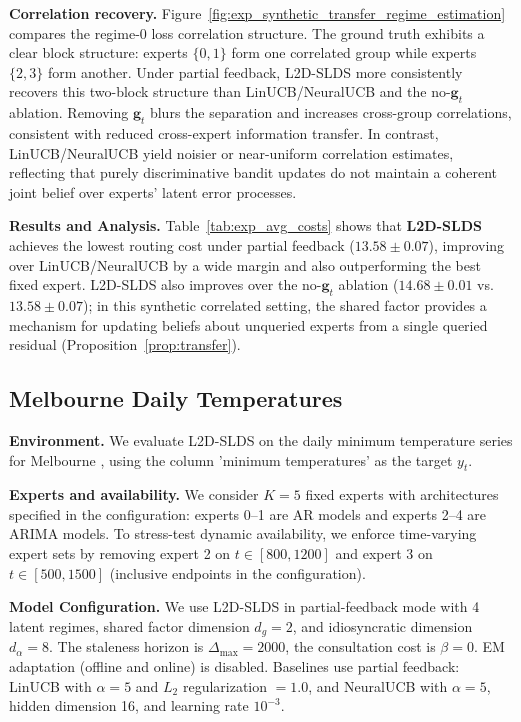 \textbf{Correlation recovery.}
Figure~\ref{fig:exp_synthetic_transfer_regime_estimation} compares the regime-0 loss correlation
structure. The ground truth exhibits a clear block structure: experts \(\{0,1\}\)
form one correlated group while experts \(\{2,3\}\) form another.
Under partial feedback, L2D-SLDS more consistently recovers this two-block structure than
LinUCB/NeuralUCB and the no-\(\mathbf{g}_t\) ablation. Removing \(\mathbf{g}_t\) blurs the separation
and increases cross-group correlations, consistent with reduced cross-expert information transfer.
In contrast, LinUCB/NeuralUCB yield noisier or near-uniform correlation estimates, reflecting that
purely discriminative bandit updates do not maintain a coherent joint belief over experts' latent
error processes.

\textbf{Results and Analysis.}
Table~\ref{tab:exp_avg_costs} shows that \textbf{L2D-SLDS} achieves the lowest routing cost under
partial feedback (\(13.58\pm 0.07\)), improving over LinUCB/NeuralUCB by a wide margin and also
outperforming the best fixed expert. L2D-SLDS also improves over the no-\(\mathbf{g}_t\) ablation
(\(14.68\pm 0.01\) vs.\ \(13.58\pm 0.07\)); in this synthetic correlated setting, the shared factor
provides a mechanism for updating beliefs about unqueried experts from a single queried residual
(Proposition~\ref{prop:transfer}).

\subsection{Melbourne Daily Temperatures}
\label{sec:exp_melbourne}

\textbf{Environment.}
We evaluate L2D-SLDS on the daily minimum temperature series for Melbourne \citep{daily_min_temp_melbourne_kaggle}, using the column 'minimum temperatures' as the target \(y_t\). 

\textbf{Experts and availability.}
We consider \(K=5\) fixed experts with architectures specified in the configuration:
experts 0--1 are AR models and experts 2--4 are ARIMA models. To stress-test dynamic availability, we enforce time-varying expert sets by removing expert 2 on
\(t\in[800,1200]\) and expert 3 on \(t\in[500,1500]\) (inclusive endpoints in the configuration).  


\textbf{Model Configuration.}
We use L2D-SLDS in partial-feedback mode with 4 latent regimes, shared factor dimension
\(d_g=2\), and idiosyncratic dimension \(d_\alpha=8\). The staleness horizon is \(\Delta_{\max}=2000\), the consultation
cost is \(\beta=0\). EM adaptation (offline and online) is disabled. Baselines use partial feedback: LinUCB with \(\alpha=5\) and \(L_2\) regularization \(=1.0\), and NeuralUCB with
\(\alpha=5\), hidden dimension 16, and learning rate \(10^{-3}\).


